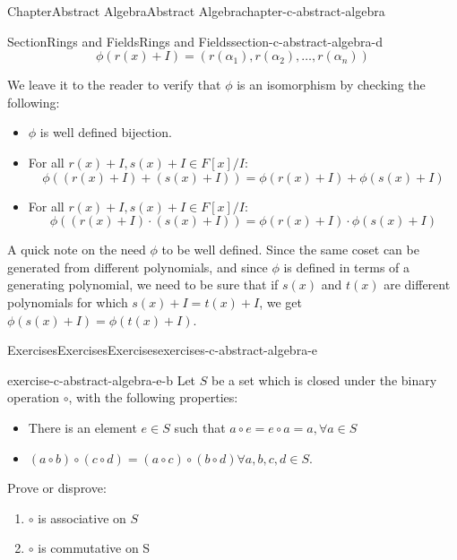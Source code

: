\documentclass[oneside,10pt,]{book}
\numberwithin{equation}{section}
\begin{document}
\begin{chapterptx}{Chapter}{Abstract Algebra}{}{Abstract Algebra}{}{}{chapter-c-abstract-algebra}
\begin{sectionptx}{Section}{Rings and Fields}{}{Rings and Fields}{}{}{section-c-abstract-algebra-d}
\begin{equation*}
\phi(r(x)+I)=(r(\alpha_1),r(\alpha_2),\dots,r(\alpha_n))
\end{equation*}
%
\par
We leave it to the reader to verify that \(\phi\) is an isomorphism by checking the following:%
\begin{itemize}[label=\textbullet]
\item{}\(\phi\) is well defined bijection.%
\item{}For all \(r(x)+I, s(x)+I  \in F[x]/I\):%
\begin{equation*}
\phi((r(x)+I)+(s(x)+I))= \phi(r(x)+I)+\phi(s(x)+I)
\end{equation*}
%
\item{}For all \(r(x)+I, s(x)+I  \in F[x]/I\):%
\begin{equation*}
\phi((r(x)+I)\cdot (s(x)+I))= \phi(r(x)+I)\cdot \phi(s(x)+I)
\end{equation*}
%
\end{itemize}
A quick note on the need \(\phi\) to be well defined.  Since the same coset can be generated from different polynomials, and since \(\phi\) is defined in terms of a generating polynomial, we need to be sure that if \(s(x)\) and \(t(x)\) are different polynomials for which \(s(x)+I=t(x)+I\), we get \(\phi(s(x)+I)=\phi(t(x)+I)\).%
\end{sectionptx}
%
%
\typeout{************************************************}
\typeout{************************************************}
%
\begin{exercises-section}{Exercises}{Exercises}{}{Exercises}{}{}{exercises-c-abstract-algebra-e}
\begin{divisionexercise}{1}{}{}{exercise-c-abstract-algebra-e-b}%
Let \(S\) be a set which is closed under the binary operation \(\circ\), with the following properties:%
\begin{itemize}[label=\textbullet]
\item{}There is an element \(e \in S\) such that \(a \circ e = e\circ a=a, \forall a\in S\)%
\item{}\((a \circ b) \circ (c \circ d) = (a \circ c) \circ (b \circ d) \forall a,b,c,d \in  S\).%
\end{itemize}
%
\par
Prove or disprove:%
\begin{enumerate}[label=(\alph*)]
\item{}\(\circ\)  is associative on \(S\)%
\item{}\(\circ\)  is commutative on S%
\end{enumerate}

\end{divisionexercise}
\end{exercises-section}
\end{chapterptx}
\end{document}
